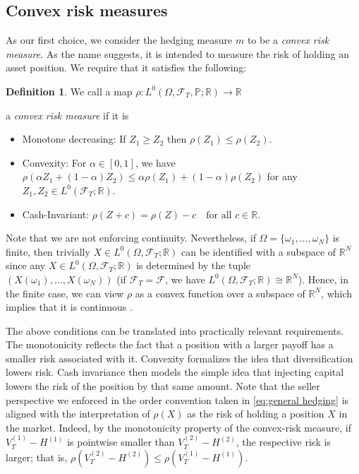 \documentclass[11pt,a4paper,twoside,openany]{report}
\numberwithin{equation}{section}
\theoremstyle{plain} %
\theoremstyle{definition} %
\newtheorem{definition}[theorem]{Definition}
\theoremstyle{remark} %
\let\parencite\authnumparencite
\begin{document}
\subsection{Convex risk measures}
As our first choice, we consider the hedging measure \(m\) to be a \textit{convex risk measure}. As the name suggests, it is intended to measure the risk of holding an asset position. We require that it satisfies the following:
\begin{definition}\label{def:convex risk measure buehler convention}
    We call a map \(\rho: L^0(\Omega,\mathcal{F}_T,\mathbb{P};\mathbb{R})\to\mathbb{R}\)
\end{definition} a \textit{convex risk measure} if it is
\begin{itemize}
    \item Monotone decreasing: If \(Z_1\geq Z_2\) then \(\rho(Z_1)\leq\rho(Z_2)\).
    \item Convexity: For \(\alpha\in[0,1]\), we have \(\rho(\alpha Z_1+(1-\alpha)Z_2)\leq \alpha\rho(Z_1)+(1-\alpha)\rho(Z_2)\) for any \(Z_1,Z_2\in L^0(\mathcal{F}_T;\mathbb{R})\). 
    \item Cash-Invariant: \(\rho(Z+c)=\rho(Z)-c \quad \text{for all } c\in\mathbb{R}\).
\end{itemize}
Note that we are not enforcing continuity. Nevertheless, if \(\Omega=\{\omega_1,\dots,\omega_N\}\) is finite, then trivially \(X\in L^0(\Omega,\mathcal{F}_T;\mathbb{R})\) can be identified with a subspace of \( \mathbb{R}^N\) since any \(X\in L^0(\Omega,\mathcal{F}_T;\mathbb{R})\) is determined by the tuple \((X(\omega_1),\dots,X(\omega_N))\) (if \(\mathcal{F}_T=\mathcal{F}\), we have \( L^0(\Omega,\mathcal{F}_T;\mathbb{R})\cong \mathbb{R}^N\)). Hence, in the finite case, we can view \(\rho\) as a convex function over a subspace of \(\mathbb{R}^N\), which implies that it is continuous \parencite[Thm.~10.1]{Rockafellar1970ConvexAnalysis}.


The above conditions can be translated into practically relevant requirements. The monotonicity reflects the fact that a position with a larger payoff has a smaller risk associated with it. Convexity formalizes the idea that diversification lowers risk. Cash invariance then models the simple idea that injecting capital lowers the risk of the position by that same amount. Note that the seller perspective we enforced in the order convention taken in \eqref{eq:general hedging} is aligned with the interpretation of \(\rho(X)\) as the risk of holding a position \(X\) in the market. Indeed, by the monotonicity property of the convex-risk measure, if \(V_T^{(1)}-H^{(1)}\) is pointwise smaller than \(V_T^{(2)}-H^{(2)}\), the respective risk is larger; that is, \(\rho(V_T^{(2)}-H^{(2)})\leq\rho(V_T^{(1)}-H^{(1)})\).
\end{document}
